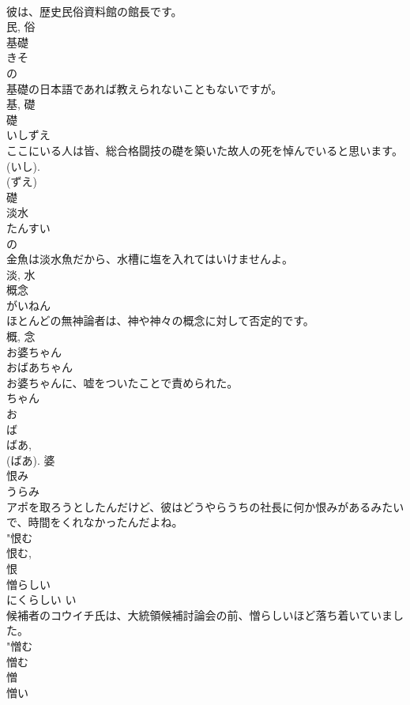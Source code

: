 \documentclass[8pt]{extreport}
\begin{document}
\begin{CJK}{UTF8}{min}
\\	彼は、歴史民俗資料館の館長です。	
\\	民, 俗	
\\	基礎	
\\	きそ	
\\	の 
\\	基礎の日本語であれば教えられないこともないですが。	
\\	基, 礎	
\\	礎	
\\	いしずえ	
\\	ここにいる人は皆、総合格闘技の礎を築いた故人の死を悼んでいると思います。	
\\	(いし). 
\\	(ずえ) 
\\	礎	
\\	淡水	
\\	たんすい	
\\	の 
\\	金魚は淡水魚だから、水槽に塩を入れてはいけませんよ。	
\\	淡, 水	
\\	概念	
\\	がいねん	
\\	ほとんどの無神論者は、神や神々の概念に対して否定的です。	
\\	概, 念	
\\	お婆ちゃん	
\\	おばあちゃん	
\\	お婆ちゃんに、嘘をついたことで責められた。	
\\	ちゃん 
\\	お 
\\	ば 
\\	ばあ, 
\\	(ばあ).	婆	
\\	恨み	
\\	うらみ	
\\	アポを取ろうとしたんだけど、彼はどうやらうちの社長に何か恨みがあるみたいで、時間をくれなかったんだよね。	
\\	"恨む 
\\	恨む, 
\\	恨	
\\	憎らしい	
\\	にくらしい	い 
\\	候補者のコウイチ氏は、大統領候補討論会の前、憎らしいほど落ち着いていました。	
\\	"憎む 
\\	憎む 
\\	憎	
\\	憎い	

\end{CJK}
\end{document}
